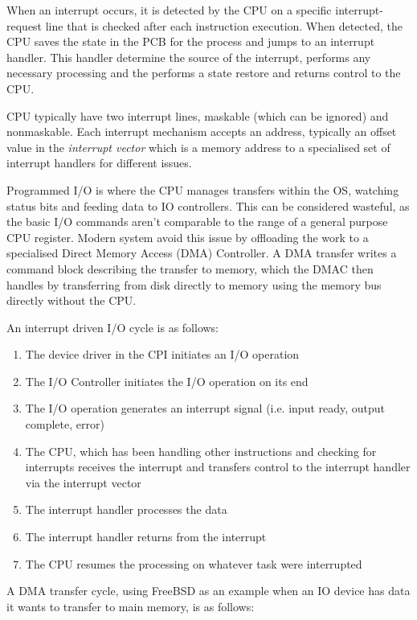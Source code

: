 \documentclass[]{article}
\begin{document}
        When an interrupt occurs, it is detected by the CPU on a specific interrupt-request line that is checked after each instruction execution. When detected, the CPU saves the state in the PCB for the process and jumps to an interrupt handler. This handler determine the source of the interrupt, performs any necessary processing and the performs a state restore and returns control to the CPU.

        CPU typically have two interrupt lines, maskable (which can be ignored) and nonmaskable. Each interrupt mechanism accepts an address, typically an offset value in the \textit{interrupt vector} which is a memory address to a specialised set of interrupt handlers for different issues.

        Programmed I/O is where the CPU manages transfers within the OS, watching status bits and feeding data to IO controllers. This can be considered wasteful, as the basic I/O commands aren't comparable to the range of a general purpose CPU register. Modern system avoid this issue by offloading the work to a specialised Direct Memory Access (DMA) Controller. A DMA transfer writes a command block describing the transfer to memory, which the DMAC then handles by transferring from disk directly to memory using the memory bus directly without the CPU.

        An interrupt driven I/O cycle is as follows:

        \begin{enumerate}
            \item The device driver in the CPI initiates an I/O operation
            \item The I/O Controller initiates the I/O operation on its end
            \item The I/O operation generates an interrupt signal (i.e. input ready, output complete, error)
            \item The CPU, which has been handling other instructions and checking for interrupts receives the interrupt and transfers control to the interrupt handler via the interrupt vector
            \item The interrupt handler processes the data
            \item The interrupt handler returns from the interrupt
            \item The CPU resumes the processing on whatever task were interrupted
        \end{enumerate}

    \newpage
        A DMA transfer cycle, using FreeBSD as an example when an IO device has data it wants to transfer to main memory, is as follows:
\end{document}
